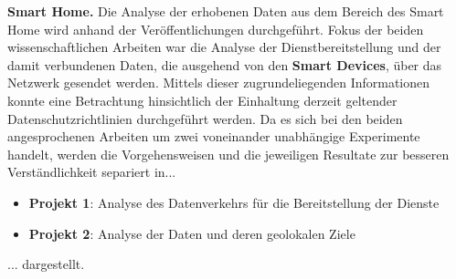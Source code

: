 \noindent \textbf{Smart Home.}
Die Analyse der erhobenen Daten aus dem Bereich des Smart Home wird anhand der Veröffentlichungen \cite{Mandalari2021,Ren2019} durchgeführt. Fokus der beiden wissenschaftlichen Arbeiten war die Analyse der Dienstbereitstellung und der damit verbundenen Daten, die ausgehend von den \textbf{Smart Devices}, über das Netzwerk gesendet werden. Mittels dieser zugrundeliegenden Informationen konnte eine Betrachtung hinsichtlich der Einhaltung derzeit geltender Datenschutzrichtlinien durchgeführt werden.
Da es sich bei den beiden angesprochenen Arbeiten um zwei voneinander unabhängige Experimente handelt, werden die Vorgehensweisen und die jeweiligen Resultate zur besseren Verständlichkeit separiert in...
\begin{itemize}
	\item \textbf{Projekt 1}: Analyse des Datenverkehrs für die Bereitstellung der Dienste
	\item \textbf{Projekt 2}: Analyse der Daten und deren geolokalen Ziele
\end{itemize}
\noindent ... dargestellt.

